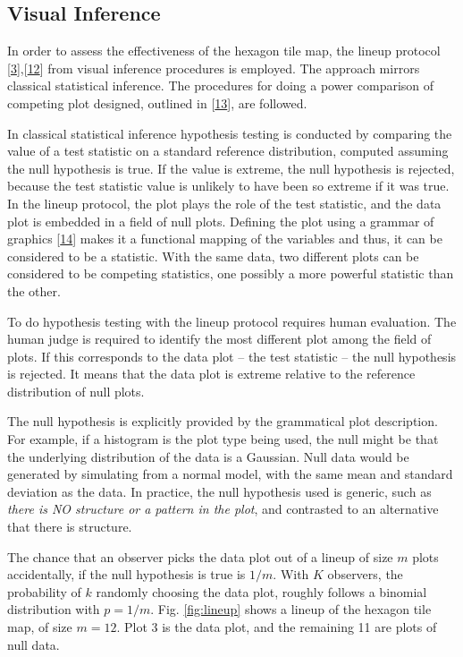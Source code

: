 \documentclass[conference,final,]{IEEEtran}
\begin{document}
\hypertarget{visual-inference}{%
\subsection{Visual Inference}\label{visual-inference}}

In order to assess the effectiveness of the hexagon tile map, the lineup protocol {[}\protect\hyperlink{ref-GIIV}{3}{]},{[}\protect\hyperlink{ref-BCHLLSW09}{12}{]} from visual inference procedures is employed. The approach mirrors classical statistical inference. The procedures for doing a power comparison of competing plot designed, outlined in {[}\protect\hyperlink{ref-GTPCCD}{13}{]}, are followed.

In classical statistical inference hypothesis testing is conducted by comparing the value of a test statistic on a standard reference distribution, computed assuming the null hypothesis is true. If the value is extreme, the null hypothesis is rejected, because the test statistic value is unlikely to have been so extreme if it was true. In the lineup protocol, the plot plays the role of the test statistic, and the data plot is embedded in a field of null plots. Defining the plot using a grammar of graphics {[}\protect\hyperlink{ref-ggplot2}{14}{]} makes it a functional mapping of the variables and thus, it can be considered to be a statistic. With the same data, two different plots can be considered to be competing statistics, one possibly a more powerful statistic than the other.

To do hypothesis testing with the lineup protocol requires human evaluation. The human judge is required to identify the most different plot among the field of plots. If this corresponds to the data plot -- the test statistic -- the null hypothesis is rejected. It means that the data plot is extreme relative to the reference distribution of null plots.

The null hypothesis is explicitly provided by the grammatical plot description. For example, if a histogram is the plot type being used, the null might be that the underlying distribution of the data is a Gaussian. Null data would be generated by simulating from a normal model, with the same mean and standard deviation as the data. In practice, the null hypothesis used is generic, such as \emph{there is NO structure or a pattern in the plot}, and contrasted to an alternative that there is structure.

The chance that an observer picks the data plot out of a lineup of size \(m\) plots accidentally, if the null hypothesis is true is \(1/m\). With \(K\) observers, the probability of \(k\) randomly choosing the data plot, roughly follows a binomial distribution with \(p=1/m\). Fig. \ref{fig:lineup} shows a lineup of the hexagon tile map, of size \(m=12\). Plot 3 is the data plot, and the remaining 11 are plots of null data.
\end{document}
